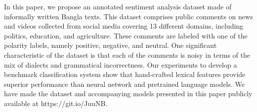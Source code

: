 In this paper, we propose an annotated sentiment analysis dataset made of informally written Bangla texts. This dataset comprises public comments on news and videos collected from social media covering 13 different domains, including politics, education, and agriculture. These comments are labeled with one of the polarity labels, namely positive, negative, and neutral. One significant characteristic of the dataset is that each of the comments is noisy in terms of the mix of dialects and grammatical incorrectness. Our experiments to develop a benchmark classification system show that hand-crafted lexical features provide superior performance than neural network and pretrained language models. We have made the dataset and accompanying models presented in this paper publicly available at https://git.io/JuuNB.
